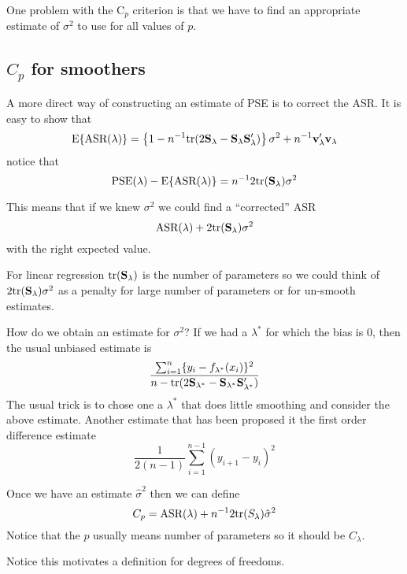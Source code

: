One problem with the $\mbox{C}_p$  criterion is that
we have to find an 
appropriate estimate of $\sigma^2$ to use for all values of $p$. 

\subsection{$C_p$ for smoothers}
A more direct way of constructing an estimate of PSE is to correct the
ASR. It is easy to show that
\[
\mbox{E}\{\mbox{ASR}(\lambda)\} = \left\{ 1 - n^{-1}\mbox{tr}(2{\mathbf S}_{\lambda} -
    {\mathbf S}_{\lambda} {\mathbf S}_{\lambda}') \right\} \sigma^2 + n^{-1}
    {\mathbf v}_{\lambda}'{\mathbf v}_{\lambda}
\]
notice that 
\[
\mbox{PSE}(\lambda) - \mbox{E}\{\mbox{ASR}(\lambda)\} = n^{-1}
2\mbox{tr}({\mathbf S}_{\lambda}) \sigma^2
\]

This means that if we knew $\sigma^2$ we could find a ``corrected''
ASR
\[
\mbox{ASR}(\lambda) + 2\mbox{tr}({\mathbf S}_{\lambda}) \sigma^2
\]
with the right expected value. 

For linear regression $\mbox{tr}({\mathbf S}_{\lambda})$ is the number of parameters
so we could think of $2\mbox{tr}({\mathbf S}_{\lambda}) \sigma^2$ as a penalty
for large number of parameters or for un-smooth estimates. 

How do we obtain an estimate for $\sigma^2$? If we had a $\lambda^*$
for which the bias is 0, then the usual unbiased estimate is
\[
\frac{\sum_{i=1}^n \{y_i - f_{\lambda^*}(x_i)\}^2}{n -
  \mbox{tr}(2{\mathbf S}_{\lambda^*} -   {\mathbf S}_{\lambda^*} {\mathbf S}_{\lambda^*}')}
\]
The usual trick is to chose one a $\lambda^*$ that does little
smoothing and consider the above estimate. Another estimate that has
been proposed it the first order difference estimate
\[
\frac{1}{2(n-1)} \sum_{i=1}^{n-1} (y_{i+1} - y_i)^2
\]

Once we have an estimate $\hat{\sigma}^2$ then we can define 
\[
C_p = \mbox{ASR}(\lambda) + n^{-1} 2\mbox{tr}(S_{\lambda})\hat{\sigma}^2
\]
Notice that the $p$ usually means number of parameters so it should be
$C_{\lambda}$. 


Notice this motivates a definition for degrees of freedoms.
